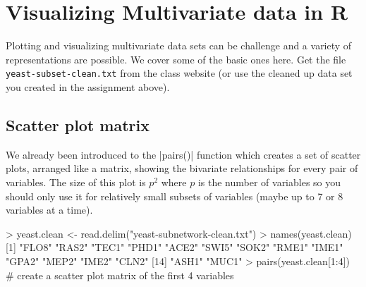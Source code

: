 
\section{Visualizing Multivariate data in R}

Plotting and visualizing multivariate data sets can be challenge and a
variety of representations are possible. We cover some of the basic ones
here. Get the file \lstinline!yeast-subset-clean.txt! from the class
website (or use the cleaned up data set you created in the assignment
above).

\subsection{Scatter plot matrix}

We already been introduced to the |pairs()| function which creates a set of scatter plots, arranged like
a matrix, showing the bivariate relationships for every pair of
variables. The size of this plot is $p^2$ where $p$ is the number of
variables so you should only use it for relatively small subsets of
variables (maybe up to 7 or 8 variables at a time).

\begin{R}
> yeast.clean <- read.delim("yeast-subnetwork-clean.txt")
> names(yeast.clean)
 [1] "FLO8" "RAS2" "TEC1" "PHD1" "ACE2" "SWI5" "SOK2" "RME1" "IME1" "GPA2" "MEP2" "IME2" "CLN2"
[14] "ASH1" "MUC1"
> pairs(yeast.clean[1:4]) # create a scatter plot matrix of the first 4 variables
\end{R}

